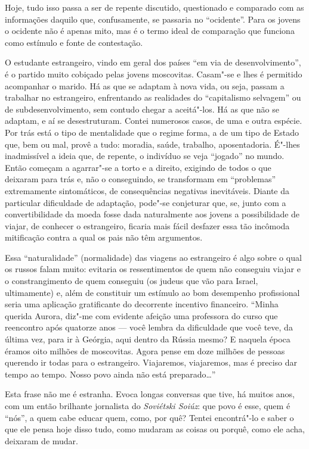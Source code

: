 Hoje, tudo isso passa a ser de repente discutido, questionado e
comparado com as informações daquilo que, confusamente, se passaria no
``ocidente''. Para os jovens o ocidente não é apenas mito, mas é o termo
ideal de comparação que funciona como estímulo e fonte de contestação.

O estudante estrangeiro, vindo em geral dos países ``em via de
desenvolvimento'', é o partido muito cobiçado pelas jovens moscovitas.
Casam"-se e lhes é permitido acompanhar o marido. Há as que se adaptam à
nova vida, ou seja, passam a trabalhar no estrangeiro, enfrentando as
realidades do ``capitalismo selvagem'' ou de subdesenvolvimento, sem
contudo chegar a aceitá"-los. Há as que não se adaptam, e aí se
desestruturam. Contei numerosos casos, de uma e outra espécie. Por trás
está o tipo de mentalidade que o regime forma, a de um tipo de Estado
que, bem ou mal, provê a tudo: moradia, saúde, trabalho, aposentadoria.
É"-lhes inadmissível a ideia que, de repente, o indivíduo se veja
``jogado'' no mundo. Então começam a agarrar"-se a torto e a direito,
exigindo de todos o que deixaram para trás e, não o conseguindo, se
transformam em ``problemas'' extremamente sintomáticos, de consequências
negativas inevitáveis. Diante da particular dificuldade de adaptação,
pode"-se conjeturar que, se, junto com a convertibilidade da moeda fosse
dada naturalmente aos jovens a possibilidade de viajar, de conhecer o
estrangeiro, ficaria mais fácil desfazer essa tão incômoda mitificação
contra a qual os pais não têm argumentos.

Essa ``naturalidade'' (normalidade) das viagens ao estrangeiro é algo
sobre o qual os russos falam muito: evitaria os ressentimentos de quem
não conseguiu viajar e o constrangimento de quem conseguiu (os judeus
que vão para Israel, ultimamente) e, além de constituir um estímulo ao
bom desempenho profissional seria uma aplicação gratificante do
decorrente incentivo financeiro. ``Minha querida Aurora, diz"-me com
evidente afeição uma professora do curso que reencontro após quatorze
anos --- você lembra da dificuldade que você teve, da última vez, para ir
à Geórgia, aqui dentro da Rússia mesmo? E naquela época éramos oito
milhões de moscovitas. Agora pense em doze milhões de pessoas querendo
ir todas para o estrangeiro. Viajaremos, viajaremos, mas é preciso dar
tempo ao tempo. Nosso povo ainda não está preparado\ldots{}''

Esta frase não me é estranha. Evoca longas conversas que tive, há muitos
anos, com um então brilhante jornalista do \emph{Soviétski Soiúz}: que
povo é esse, quem é ``nós'', a quem cabe educar quem, como, por quê?
Tentei encontrá"-lo e saber o que ele pensa hoje disso tudo, como mudaram
as coisas ou porquê, como ele acha, deixaram de mudar.

